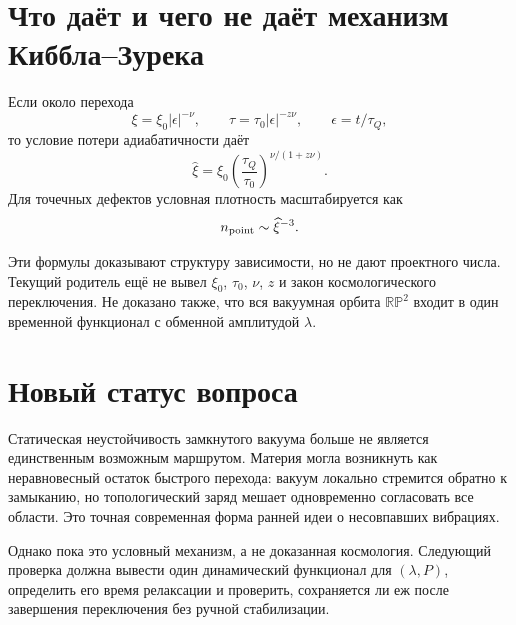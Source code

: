 \section{Что даёт и чего не даёт механизм Киббла--Зурека}

Если около перехода
\begin{equation}
 \xi=\xi_0|\epsilon|^{-\nu},
 \qquad
 \tau=\tau_0|\epsilon|^{-z\nu},
 \qquad
 \epsilon=t/\tau_Q,
\end{equation}
то условие потери адиабатичности даёт
\begin{equation}
 \widehat\xi
 =\xi_0\left(\frac{\tau_Q}{\tau_0}\right)^{
 \nu/(1+z\nu)}.
 \label{eq:v6-kz-freezeout-length}
\end{equation}
Для точечных дефектов условная плотность масштабируется как
\begin{equation}
 n_{\rm point}\sim\widehat\xi^{-3}.
 \label{eq:v6-kz-point-density}
\end{equation}

Эти формулы доказывают структуру зависимости, но не дают проектного числа.
Текущий родитель ещё не вывел $\xi_0$, $\tau_0$, $\nu$, $z$ и закон
космологического переключения. Не доказано также, что вся вакуумная орбита
$\mathbb{RP}^2$ входит в один временной функционал с обменной амплитудой
$\lambda$.

\section{Новый статус вопроса}

Статическая неустойчивость замкнутого вакуума больше не является
единственным возможным маршрутом. Материя могла возникнуть как
неравновесный остаток быстрого перехода: вакуум локально стремится обратно
к замыканию, но топологический заряд мешает одновременно согласовать все
области. Это точная современная форма ранней идеи о несовпавших вибрациях.

Однако пока это условный механизм, а не доказанная космология. Следующий
проверка должна вывести один динамический функционал для
$(\lambda,P)$, определить его время релаксации и проверить, сохраняется ли
еж после завершения переключения без ручной стабилизации.

